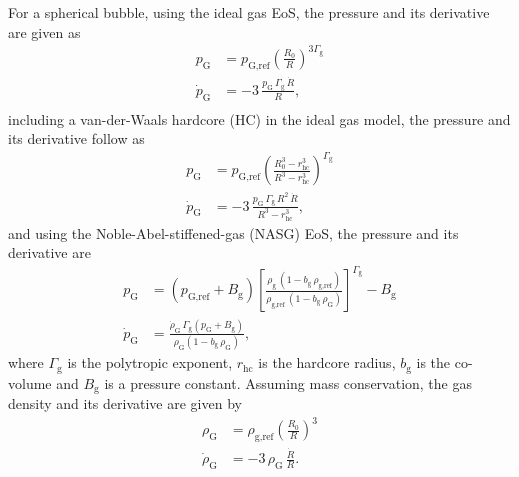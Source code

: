 For a spherical bubble, using the ideal gas EoS, the pressure and its derivative are given as
\begin{align}
  p_\text{G} &= p_\text{G,ref} \left(\frac{R_0}{R}\right)^{3 \Gamma_\text{g}}\\
  \dot{p}_\text{G} &= -3 \, \frac{p_\text{G} \, \Gamma_\text{g} \, \dot{R}}{R},\\
\end{align}
including a van-der-Waals hardcore (HC) in the ideal gas model, the pressure and its derivative follow as
\begin{align}
  p_\text{G} &= p_\text{G,ref} \left(\frac{R_0^3-r_\text{hc}^3}{R^3-r_\text{hc}^3}\right)^{\Gamma_\text{g}}\\
  \dot{p}_\text{G} &= -3 \, \frac{p_\text{G} \, \Gamma_\text{g} \, R^2 \, \dot{R}}{R^3-r_\text{hc}^3},
\end{align}
and using the Noble-Abel-stiffened-gas (NASG) EoS, the pressure and its derivative are \citep{Denner2021}
\begin{align}
  p_\text{G} &= (p_\text{G,ref} + B_\text{g}) \left[\frac{\rho_\text{g} \, (1-b_\text{g} \, \rho_\text{g,ref})}{\rho_\text{g,ref} \, (1- b_\text{g} \, \rho_\text{G})} \right]^{\Gamma_\text{g}} - B_\text{g}\\
  \dot{p}_\text{G} &= \frac{\dot{\rho}_\text{G} \, \Gamma_\text{g} \left(p_\text{G} + B_\text{g} \right)}{\rho_\text{G} \left(1- b_\text{g} \, \rho_\text{G} \right)},
\end{align}
where $\Gamma_\mathrm{g}$ is the polytropic exponent, $r_\mathrm{hc}$ is the hardcore radius, $b_\mathrm{g}$ is the co-volume and $B_\mathrm{g}$ is a pressure constant. Assuming mass conservation, the gas density and its derivative are given by 
\begin{align}
  \rho_\text{G} &= \rho_\text{g,ref} \left(\frac{R_0}{R}\right)^3 \label{eq:rhoG}\\
  \dot{\rho}_\text{G} &= -3 \, \rho_\text{G}\, \frac{\dot{R}}{R}. \label{eq:dot_rhoG}
\end{align}

